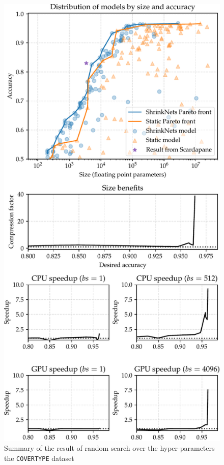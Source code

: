 \begin{figure}
\begin{center}
\includegraphics[width=\columnwidth]{COVER_FC_summary}
\vspace*{-5mm}
\caption{\label{figure_COVER} Summary of the result of random
search over the hyper-parameters the \texttt{COVERTYPE} dataset
}
\end{center}
\vspace*{-4mm}
\end{figure}


